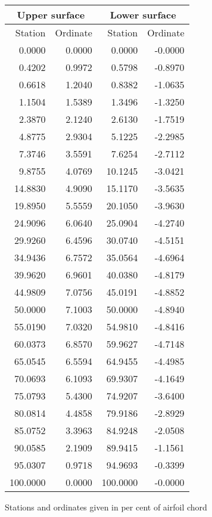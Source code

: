 \documentclass[11pt]{book}
\begin{document}
 \hspace{4mm}
 \begin{tabular}{|r|r|r|r|} \hline 
 \multicolumn{2}{|c|}{Upper surface} & \multicolumn{2}{|c|}{Lower surface} \\
 \hline
 Station & Ordinate & Station & Ordinate \\
 \hline
0.0000 & 0.0000 & 0.0000 & -0.0000 \\
0.4202 & 0.9972 & 0.5798 & -0.8970 \\
0.6618 & 1.2040 & 0.8382 & -1.0635 \\
1.1504 & 1.5389 & 1.3496 & -1.3250 \\
2.3870 & 2.1240 & 2.6130 & -1.7519 \\
4.8775 & 2.9304 & 5.1225 & -2.2985 \\
7.3746 & 3.5591 & 7.6254 & -2.7112 \\
9.8755 & 4.0769 & 10.1245 & -3.0421 \\
14.8830 & 4.9090 & 15.1170 & -3.5635 \\
19.8950 & 5.5559 & 20.1050 & -3.9630 \\
24.9096 & 6.0640 & 25.0904 & -4.2740 \\
29.9260 & 6.4596 & 30.0740 & -4.5151 \\
34.9436 & 6.7572 & 35.0564 & -4.6964 \\
39.9620 & 6.9601 & 40.0380 & -4.8179 \\
44.9809 & 7.0756 & 45.0191 & -4.8852 \\
50.0000 & 7.1003 & 50.0000 & -4.8940 \\
55.0190 & 7.0320 & 54.9810 & -4.8416 \\
60.0373 & 6.8570 & 59.9627 & -4.7148 \\
65.0545 & 6.5594 & 64.9455 & -4.4985 \\
70.0693 & 6.1093 & 69.9307 & -4.1649 \\
75.0793 & 5.4300 & 74.9207 & -3.6400 \\
80.0814 & 4.4858 & 79.9186 & -2.8929 \\
85.0752 & 3.3963 & 84.9248 & -2.0508 \\
90.0585 & 2.1909 & 89.9415 & -1.1561 \\
95.0307 & 0.9718 & 94.9693 & -0.3399 \\
100.0000 & 0.0000 & 100.0000 & -0.0000 \\
 \hline 
 \end{tabular}
 \vspace{8mm}

Stations and ordinates given in per cent of airfoil chord
\end{document}
